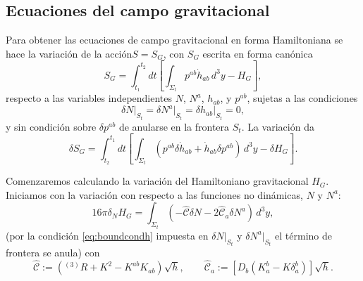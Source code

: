 
\subsection{Ecuaciones del campo gravitacional}

Para obtener las ecuaciones de campo gravitacional en forma Hamiltoniana se hace la variaci\'{o}n de la acci\'{o}n\footnotemark $S = S_{G}$, con $S_{G}$ escrita en forma can\'{o}nica
%
\begin{equation}
S_{G} = \int^{t_2}_{t_1} dt \left[ \int_{\Sigma_{t}} p^{ab} \dot{h}_{ab} \, d^{3} y - H_{G} \right],
\end{equation}
%
respecto a las variables independientes $N$, $N^{a}$, $h_{ab}$, y $p^{ab}$, sujetas a las condiciones
%
\begin{equation}
\label{eq:boundcondh}
\delta N \Big|_{S_{t}} = \delta N^{a} \Big|_{S_{t}} = \delta h_{ab} \Big|_{S_{t}} = 0,
\end{equation}
%
y sin condici\'{o}n sobre $\delta p^{ab}$ de anularse en la frontera $S_{t}$. La variaci\'{o}n da
%
\begin{equation}
\label{eq:varSG31}
\delta S_{G} = \int^{t_1}_{t_2} dt \left[ \int_{\Sigma_{t}} (p^{ab} \delta \dot{h}_{ab} + \dot{h}_{ab} \delta p^{ab}) \, d^{3} y - \delta H_{G} \right].
\end{equation}

Comenzaremos calculando la variaci\'{o}n del Hamiltoniano gravitacional $H_{G}$. Iniciamos con la variaci\'{o}n con respecto a las funciones no din\'{a}micas, $N$ y $N^{a}$:
%
\begin{equation}
\label{eq:varHcrNNa}
16 \pi \delta_{N} H_{G} = \int_{\Sigma_{t}} (- \hat{\mathcal{C}} \delta N - 2 \hat{\mathcal{C}}_{a} \delta N^{a}) \, d^{3} y,
\end{equation}
%
(por la condici\'{o}n \eqref{eq:boundcondh} impuesta en $\delta N \Big|_{S_{t}}$ y $\delta N^{a} \Big|_{S_{t}}$ el t\'{e}rmino de frontera se anula) con
%
\begin{equation}
\hat{\mathcal{C}} := (^{(3)}R + K^{2} - K^{ab} K_{ab}) \sqrt{h}, \qquad \hat{\mathcal{C}}_{a} := [D_{b} (K_{a}^{b} - K \delta_{a}^{b})] \sqrt{h}.
\end{equation}

